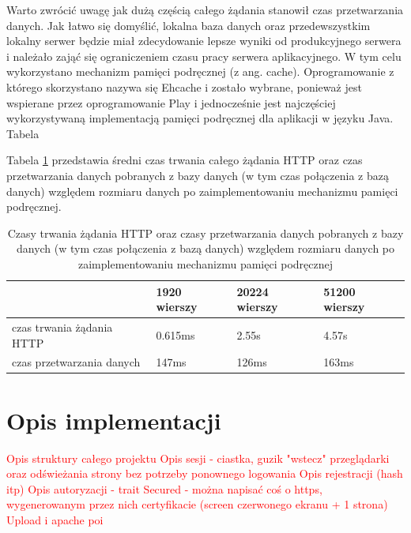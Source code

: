 \documentclass[a4paper,12pt,twoside]{article}
\begin{document}
Warto zwrócić uwagę jak dużą częścią całego żądania stanowił czas przetwarzania danych. Jak łatwo się domyślić, lokalna baza danych oraz przedewszystkim lokalny serwer będzie miał zdecydowanie lepsze wyniki od produkcyjnego serwera i należało 
zająć się ograniczeniem czasu pracy serwera aplikacyjnego.
W tym celu wykorzystano mechanizm pamięci podręcznej (z ang. cache).
Oprogramowanie z którego skorzystano nazywa się Ehcache \cite{cache} i 
zostało wybrane, ponieważ jest wspierane przez oprogramowanie Play
i jednocześnie jest najczęściej wykorzystywaną implementacją pamięci podręcznej
dla aplikacji w języku Java. Tabela 

Tabela \ref{table:httpRequestTimeCache} przedstawia średni czas trwania 
całego żądania HTTP oraz czas przetwarzania danych pobranych z bazy danych
(w tym czas połączenia z bazą danych) względem rozmiaru danych po zaimplementowaniu
mechanizmu pamięci podręcznej.

\begin{center}
\begin{table} [H]
\begin{tabular}{| p{3cm} | p{3cm} | p{3cm} | p{3cm}|}
\hline
& 1920 wierszy &  20224 wierszy & 51200 wierszy\\ 
\hline
czas trwania żądania HTTP& 0.615ms & 2.55s& 4.57s \\ \hline  
czas przetwarzania danych& 147ms& 126ms& 163ms\\ \hline  
\end{tabular}
\caption{Czasy trwania żądania HTTP  oraz czasy przetwarzania danych pobranych z bazy danych (w tym czas połączenia z bazą danych) względem rozmiaru danych po zaimplementowaniu mechanizmu pamięci podręcznej}

\label{table:httpRequestTimeCache}
\end{table}
\end{center} 

\newpage
\section{Opis implementacji}  
\textcolor{red}{
Opis struktury całego projektu
\newline
Opis sesji -  ciastka, guzik "wstecz" przeglądarki oraz odświeżania strony bez potrzeby ponownego logowania
\newline
Opis rejestracji (hash itp)
\newline
Opis autoryzacji - trait Secured - można napisać coś o https, wygenerowanym przez nich certyfikacie (screen czerwonego ekranu + 1 strona)
\newline
Upload i apache poi
}
\end{document}
